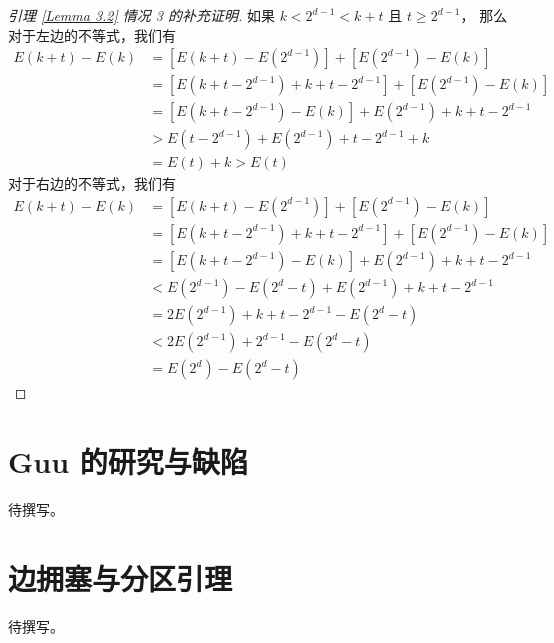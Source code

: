 \begin{proof}[引理 \ref{Lemma 3.2} 情况 3 的补充证明]
如果 $k < 2^{d − 1} < k + t$ 且 $t \ge 2^{d - 1}$，
那么对于左边的不等式，我们有
\begin{align*}
E(k + t) - E(k) & = \left[E(k + t) - E(2^{d - 1})\right] +
		    \left[E(2^{d - 1}) - E(k)\right] \\
		& = \left[E(k + t - 2^{d - 1}) + k + t - 2^{d - 1}\right] +
		    \left[E(2^{d - 1}) - E(k)\right] \\
		& = \left[E(k + t - 2^{d - 1}) - E(k)\right] +
		    E(2^{d - 1}) + k + t - 2^{d - 1} \\
		& > E(t - 2^{d - 1}) + E(2^{d - 1}) + t - 2^{d - 1} + k \\
		& = E(t) + k > E(t)
\end{align*}
对于右边的不等式，我们有
\begin{align*}
E(k + t) - E(k) & = \left[E(k + t) - E(2^{d - 1})\right] +
		    \left[E(2^{d - 1}) - E(k)\right] \\
		& = \left[E(k + t - 2^{d - 1}) + k + t - 2^{d - 1}\right] +
		    \left[E(2^{d - 1}) - E(k)\right] \\
		& = \left[E(k + t - 2^{d - 1}) - E(k)\right] +
		    E(2^{d - 1}) + k + t - 2^{d - 1} \\
		& < E(2^{d - 1}) - E(2^d - t) + E(2^{d - 1}) +
		    k + t - 2^{d - 1} \\
		& = 2 E(2^{d - 1}) + k + t - 2^{d - 1} - E(2^d - t) \\
		& < 2 E(2^{d - 1}) + 2^{d - 1} - E(2^d - t) \\
		& = E(2^d) - E(2^d - t)
\end{align*}
\end{proof}

\section{Guu 的研究与缺陷}
\label{Section 3.2}

待撰写。

\section{边拥塞与分区引理}
\label{Section 3.3}

待撰写。
